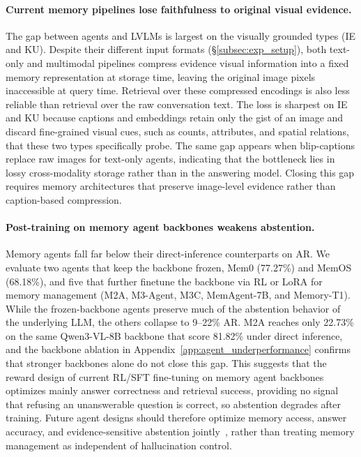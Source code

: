 \documentclass{article}
\begin{document}
\paragraph{Current memory pipelines lose faithfulness to original visual evidence.}
The gap between agents and LVLMs is largest on the visually grounded types (IE and KU). Despite their different input formats (\S\ref{subsec:exp_setup}), both text-only and multimodal pipelines compress evidence visual information into a fixed memory representation at storage time, leaving the original image pixels inaccessible at query time. Retrieval over these compressed encodings is also less reliable than retrieval over the raw conversation text. The loss is sharpest on IE and KU because captions and embeddings retain only the gist of an image and discard fine-grained visual cues, such as counts, attributes, and spatial relations, that these two types specifically probe. The same gap appears when blip-captions replace raw images for text-only agents, indicating that the bottleneck lies in lossy cross-modality storage rather than in the answering model. Closing this gap requires memory architectures that preserve image-level evidence rather than caption-based compression.

\paragraph{Post-training on memory agent backbones weakens abstention.}
Memory agents fall far below their direct-inference counterparts on AR. We evaluate two agents that keep the backbone frozen, Mem0 (77.27\%) and MemOS (68.18\%), and five that further finetune the backbone via RL or LoRA for memory management (M2A, M3-Agent, M3C, MemAgent-7B, and Memory-T1). While the frozen-backbone agents preserve much of the abstention behavior of the underlying LLM, the others collapse to 9--22\% AR. M2A reaches only 22.73\% on the same Qwen3-VL-8B backbone that score 81.82\% under direct inference, and the backbone ablation in Appendix~\ref{app:agent_underperformance} confirms that stronger backbones alone do not close this gap. This suggests that the reward design of current RL/SFT fine-tuning on memory agent backbones optimizes mainly answer correctness and retrieval success, providing no signal that refusing an unanswerable question is correct, so abstention degrades after training. Future agent designs should therefore optimize memory access, answer accuracy, and evidence-sensitive abstention jointly~\citep{zhai2026abstainr1}, rather than treating memory management as independent of hallucination control.
\end{document}
